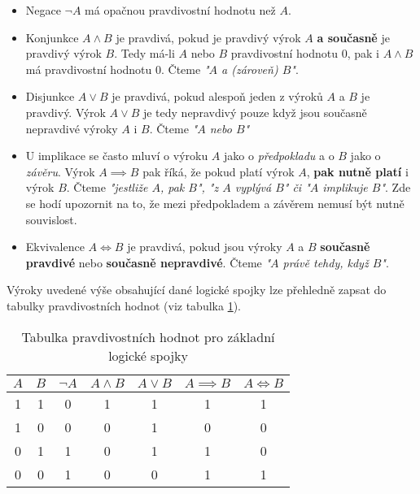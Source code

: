 \begin{itemize}
    \item Negace $\neg A$ má opačnou pravdivostní hodnotu než $A$.
    \item Konjunkce $A \land B$ je pravdivá, pokud je pravdivý výrok $A$ \textbf{a současně} je pravdivý výrok $B$. Tedy má-li $A$ nebo $B$ pravdivostní hodnotu 0, pak i $A \land B$ má pravdivostní hodnotu 0. Čteme \emph{"$A$ a (zároveň) $B$"}.
    \item Disjunkce $A \lor B$ je pravdivá, pokud alespoň jeden z výroků $A$ a $B$ je pravdivý. Výrok $A \lor B$ je tedy nepravdivý pouze když jsou současně nepravdivé výroky $A$ i $B$. Čteme \emph{"$A$ nebo $B$"}
    \item U implikace se často mluví o výroku $A$ jako o \emph{předpokladu} a o $B$ jako o \emph{závěru}. Výrok $A \implies B$ pak říká, že pokud platí výrok $A$, \textbf{pak nutně platí} i výrok $B$. Čteme \emph{"jestliže $A$, pak $B$", "z $A$ vyplývá $B$" či "$A$ implikuje $B$"}. Zde se hodí upozornit na to, že mezi předpokladem a závěrem nemusí být nutně souvislost.
    \item Ekvivalence $A \iff B$ je pravdivá, pokud jsou výroky $A$ a $B$ \textbf{současně pravdivé} nebo \textbf{současně nepravdivé}. Čteme \emph{"$A$ právě tehdy, když $B$"}.
\end{itemize}

Výroky uvedené výše obsahující dané logické spojky lze přehledně zapsat do tabulky pravdivostních hodnot (viz tabulka \ref{tab:logicke_spojky}).

\begin{table}[h]
    \centering
    \begin{tabular}{|cc|ccccc|}
    \hline
    $A$ & $B$ & $\neg A$ & $A \land B$ & $A \lor B$ & $A \implies B$ & $A \iff B$ \\ \hline
    1   & 1   & 0        & 1           & 1          & 1              & 1          \\
    1   & 0   & 0        & 0           & 1          & 0              & 0          \\
    0   & 1   & 1        & 0           & 1          & 1              & 0          \\
    0   & 0   & 1        & 0           & 0          & 1              & 1          \\ \hline
    \end{tabular}
    \caption{Tabulka pravdivostních hodnot pro základní logické spojky}
    \label{tab:logicke_spojky}
\end{table}


